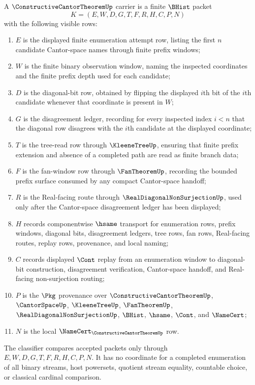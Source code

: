 \begin{definition}
\label{def:constructive-cantor-finite-diagonal-carrier}
A $\ConstructiveCantorTheoremUp$ carrier is a finite $\BHist$ packet
$$
K=(E,W,D,G,T,F,R,H,C,P,N)
$$
with the following visible rows:
\begin{enumerate}
\item $E$ is the displayed finite enumeration attempt row, listing the first $n$ candidate Cantor-space names through finite prefix windows;
\item $W$ is the finite binary observation window, naming the inspected coordinates and the finite prefix depth used for each candidate;
\item $D$ is the diagonal-bit row, obtained by flipping the displayed $i$th bit of the $i$th candidate whenever that coordinate is present in $W$;
\item $G$ is the disagreement ledger, recording for every inspected index $i<n$ that the diagonal row disagrees with the $i$th candidate at the displayed coordinate;
\item $T$ is the tree-read row through $\KleeneTreeUp$, ensuring that finite prefix extension and absence of a completed path are read as finite branch data;
\item $F$ is the fan-window row through $\FanTheoremUp$, recording the bounded prefix surface consumed by any compact Cantor-space handoff;
\item $R$ is the Real-facing route through $\RealDiagonalNonSurjectionUp$, used only after the Cantor-space disagreement ledger has been displayed;
\item $H$ records componentwise $\hsame$ transport for enumeration rows, prefix windows, diagonal bits, disagreement ledgers, tree rows, fan rows, Real-facing routes, replay rows, provenance, and local naming;
\item $C$ records displayed $\Cont$ replay from an enumeration window to diagonal-bit construction, disagreement verification, Cantor-space handoff, and Real-facing non-surjection routing;
\item $P$ is the $\Pkg$ provenance over $\ConstructiveCantorTheoremUp$, $\CantorSpaceUp$, $\KleeneTreeUp$, $\FanTheoremUp$, $\RealDiagonalNonSurjectionUp$, $\BHist$, $\hsame$, $\Cont$, and $\NameCert$;
\item $N$ is the local $\NameCert_{\ConstructiveCantorTheoremUp}$ row.
\end{enumerate}
The classifier compares accepted packets only through $E,W,D,G,T,F,R,H,C,P,N$. It has no coordinate for a completed enumeration of all binary streams, host powersets, quotient stream equality, countable choice, or classical cardinal comparison.
\end{definition}

